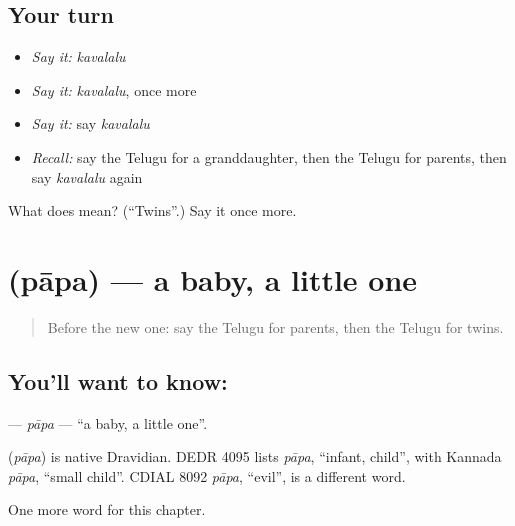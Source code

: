 \subsection*{Your turn}
\begin{itemize}
\raggedright
  \item \emph{Say it:} \emph{kavalalu}
  \item \emph{Say it:} \emph{kavalalu}, once more
  \item \emph{Say it:} say \emph{kavalalu}
  \item \emph{Recall:} say the Telugu for a granddaughter, then the Telugu for parents, then say \emph{kavalalu} again
\end{itemize}

\begin{tcolorbox}[breakable,colback=teal!4,colframe=teal!35!black,title={Before you move on}]
What does  mean? (\textquotedblleft{}Twins\textquotedblright{}.) Say it once more.
\end{tcolorbox}
\section[\texorpdfstring{\te{పాప} (pāpa)}{పాప (pāpa)}]{ (pāpa) — a baby, a little one}

\label{lesson:TE-C186-papa}



\begin{quote}
Before the new one: say the Telugu for parents, then the Telugu for twins.
\end{quote}

\subsection*{You'll want to know: }
\textbf{} — \emph{pāpa} — \textquotedblleft{}a baby, a little one\textquotedblright{}.

\begin{cousinweb}
\textbf{} (\emph{pāpa}) is native Dravidian. DEDR 4095 lists \emph{pāpa}, \textquotedblleft{}infant, child\textquotedblright{}, with Kannada \emph{pāpa}, \textquotedblleft{}small child\textquotedblright{}. CDIAL 8092 \emph{pāpa}, \textquotedblleft{}evil\textquotedblright{}, is a different word.
\end{cousinweb}

\begin{grammarlens}[title={What you've built}]
One more word for this chapter.
\end{grammarlens}

